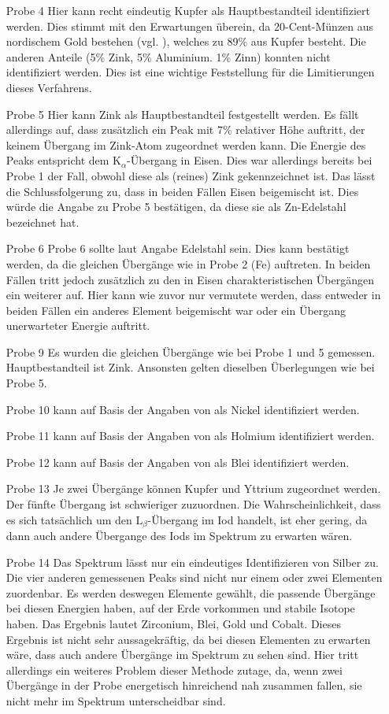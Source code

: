 \documentclass[
	a4paper,
	12pt,
	pagesize,
	ngerman
]{scrartcl}
\begin{document}
	\begin{enumerate}
		\item[Probe 4] Hier kann recht eindeutig Kupfer als Hauptbestandteil identifiziert werden. Dies stimmt mit den Erwartungen überein, da 20-Cent-Münzen aus nordischem Gold bestehen (vgl. \cite{muenzen}), welches zu 89\% aus Kupfer besteht. Die anderen Anteile (5\% Zink, 5\% Aluminium. 1\% Zinn) konnten nicht identifiziert werden. Dies ist eine wichtige Feststellung für die Limitierungen dieses Verfahrens.
		\item[Probe 5] Hier kann Zink als Hauptbestandteil festgestellt werden. Es fällt allerdings auf, dass zusätzlich ein Peak mit 7\% relativer Höhe auftritt, der keinem Übergang im Zink-Atom zugeordnet werden kann. Die Energie des Peaks entspricht dem $\text{K}_\alpha$-Übergang in Eisen. Dies war allerdings bereits bei Probe 1 der Fall, obwohl diese als (reines) Zink gekennzeichnet ist. Das lässt die Schlussfolgerung zu, dass in beiden Fällen Eisen beigemischt ist. Dies würde die Angabe zu Probe 5 bestätigen, da diese sie als Zn-Edelstahl bezeichnet hat.
		\item[Probe 6] Probe 6 sollte laut Angabe Edelstahl sein. Dies kann bestätigt werden, da die gleichen Übergänge wie in Probe 2 (Fe) auftreten. In beiden Fällen tritt jedoch zusätzlich zu den in Eisen charakteristischen Übergängen ein weiterer auf. Hier kann wie zuvor nur vermutete werden, dass entweder in beiden Fällen ein anderes Element beigemischt war oder ein Übergang unerwarteter Energie auftritt.
		\item[Probe 9] Es wurden die gleichen Übergänge wie bei Probe 1 und 5 gemessen. Hauptbestandteil ist Zink. Ansonsten gelten dieselben Überlegungen wie bei Probe 5.
		\item[Probe 10] kann auf Basis der Angaben von \cite{XRAYDB} als Nickel identifiziert werden.
		\item[Probe 11] kann auf Basis der Angaben von \cite{XRAYDB} als Holmium identifiziert werden.
		\item[Probe 12] kann auf Basis der Angaben von \cite{XRAYDB} als Blei identifiziert werden.
		\item[Probe 13] Je zwei Übergänge können Kupfer und Yttrium zugeordnet werden. Der fünfte Übergang ist schwieriger zuzuordnen. Die Wahrscheinlichkeit, dass es sich tatsächlich um den $\text{L}_\beta$-Übergang im Iod handelt, ist eher gering, da dann auch andere Übergange des Iods im Spektrum zu erwarten wären. %
		\item[Probe 14] Das Spektrum lässt nur ein eindeutiges Identifizieren von Silber zu. Die vier anderen gemessenen Peaks sind nicht nur einem oder zwei Elementen zuordenbar. Es werden deswegen Elemente gewählt, die passende Übergänge bei diesen Energien haben, auf der Erde vorkommen und stabile Isotope haben. Das Ergebnis lautet Zirconium, Blei, Gold und Cobalt. Dieses Ergebnis ist nicht sehr aussagekräftig, da bei diesen Elementen zu erwarten wäre, dass auch andere Übergänge im Spektrum zu sehen sind. Hier tritt allerdings ein weiteres Problem dieser Methode zutage, da, wenn zwei Übergänge in der Probe energetisch hinreichend nah zusammen fallen, sie nicht mehr im Spektrum unterscheidbar sind.

\end{enumerate}
\end{document}
